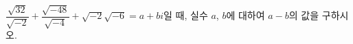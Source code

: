 $\dfrac{\sqrt{32}}{\sqrt{-2}}+\dfrac{\sqrt{-48}}{\sqrt{-4}}+\sqrt{-2}\sqrt{-6}=a+bi$일 때, 실수 $a$, $b$에 대하여 $a-b$의 값을 구하시오.
